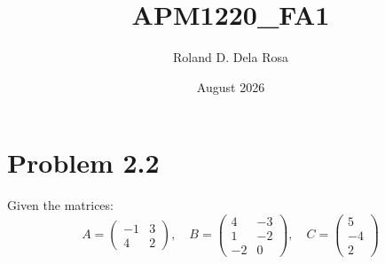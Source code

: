 \documentclass{article}
\begin{document}
\title{APM1220\_FA1}
\author{Roland D. Dela Rosa}
\date{August 2026}
\maketitle

\section*{Problem 2.2}
Given the matrices:
\[
A=\begin{pmatrix}-1&3\\ 4&2\end{pmatrix}, \quad B=\begin{pmatrix}4&-3\\ 1&-2\\ -2&0\end{pmatrix}, \quad C=\begin{pmatrix}5\\ -4\\ 2\end{pmatrix}
\]
\end{document}
